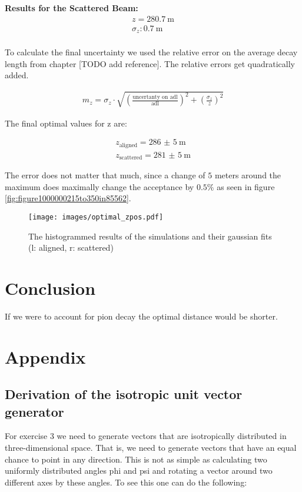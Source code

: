 \documentclass[12pt,a4paper,oneside,english]{article}
\begin{document}
	\textbf{Results for the Scattered Beam:}
		\begin{align*}
		z = \SI{280.7}{\meter}\\
		\sigma _z  : \SI{0.7}{\meter}\\
		\end{align*}
		
To calculate the final uncertainty we used the relative error on the average decay length from chapter [TODO add reference]. The relative errors get quadratically added.
		
		\begin{align}
			m_z = \sigma _z \cdot \sqrt{ \left(\frac{\text{uncertanty on adl}}{\text{adl}}\right)^2 +  \left(\frac{\sigma_z}{z}\right)^2}
		\end{align}
		
		The final optimal values for z are:
		
		\begin{align*}
			z_{\text{aligned}} =  \SI{286(5)}{\meter}\\
			z_{\text{scattered}} =  \SI{281(5)}{\meter}
		\end{align*}
		
		The error does not matter that much, since a change of $5$ meters around the maximum does maximally change the acceptance by $0.5\%$ as seen in figure \ref{fig:figure1000000215to350in85562}.
		
\begin{figure}[H]
	\texttt{[image: images/optimal\_zpos.pdf]}
	\caption{The histogrammed results of the simulations and their gaussian fits (l: aligned, r: scattered)}
	\label{fig:optimalzpos}
\end{figure}

\section{Conclusion}
If we were to account for pion decay the optimal distance would be shorter.
\appendix
\section{Appendix}
\subsection{Derivation of the isotropic unit vector generator}
\label{subsec: unit_vector}
For exercise 3 we need to generate vectors that are isotropically distributed in three-dimensional space. That is, we need to generate vectors that have an equal chance to point in any direction. This is not as simple as calculating two uniformly distributed angles phi and psi and rotating a vector around two different axes by these angles. To see this one can do the following:
\end{document}
